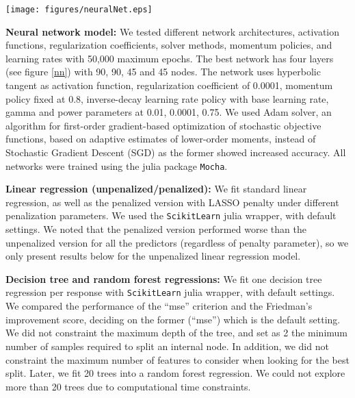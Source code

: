 \documentclass[conference]{IEEEtran}
\begin{document}
\begin{figure*}
\centering
\texttt{[image: figures/neuralNet.eps]}
\caption{Neural network for predicting functional markers (18
  responses) from surface markers (15 predictors) with 4 hidden
  layers with 90, 90, 45 and 45 nodes each.}
\label{nn}
\end{figure*}


\vspace{0.25cm}
\noindent \textbf{Neural network model:} We tested different network
architectures, activation functions, regularization coefficients,
solver methods, momentum policies, and learning rates with 50,000 maximum epochs. The best
network has four layers (see figure \ref{nn}) with 90, 90, 45 and 45
nodes. The network uses hyperbolic tangent as activation function,
regularization coefficient of 0.0001, momentum policy fixed at 0.8, inverse-decay learning
rate policy with base learning rate, gamma and power parameters at 0.01, 0.0001, 0.75. We used Adam solver\cite{Kingma2014}, an
algorithm for first-order gradient-based optimization of stochastic
objective functions, based on adaptive estimates of lower-order
moments, instead of Stochastic Gradient Descent (SGD) as the former
showed increased accuracy. All networks were trained using the julia
package \texttt{Mocha}\cite{Bezanson2017,mocha}.

\vspace{0.25cm}
\noindent \textbf{Linear regression (unpenalized/penalized):} We fit
standard linear regression, as well as the penalized version with
LASSO penalty under different penalization parameters. We used the
\texttt{ScikitLearn}\cite{scikit} julia wrapper, with default
settings. We noted that the penalized version performed worse than the
unpenalized version for all the predictors (regardless of penalty
parameter), so we only present results below for the unpenalized
linear regression model.

\vspace{0.25cm}
\noindent \textbf{Decision tree and random forest regressions:} We fit one decision tree
regression per response with \texttt{ScikitLearn} julia wrapper, with default
settings. We compared the performance of the ``mse'' criterion and the
Friedman's improvement score, deciding on the former (``mse'') which
is the default setting. We did not constraint the maximum depth of the
tree, and set as 2 the minimum number of samples required to split an
internal node. In addition, we did not constraint the maximum number
of features to consider when looking for the best split. Later, we fit
20 trees into a random forest regression. We could not explore more than 20
trees due to computational time constraints.
\end{document}
